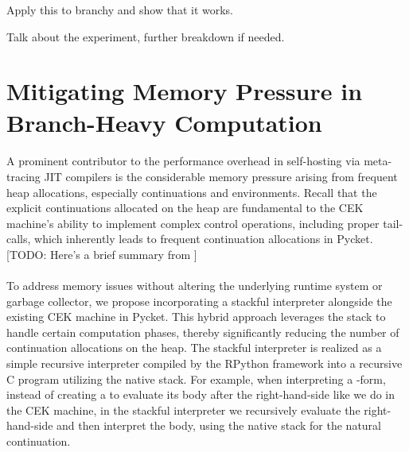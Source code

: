     \begin{show-experiment}
      Apply this to branchy and show that it works.
    \end{show-experiment}

    \begin{paragraph-here}
      Talk about the experiment, further breakdown if needed.
    \end{paragraph-here}

	\section[\texorpdfstring{Mitigating Memory Pressure in Branch-Heavy Computation}{CEK + Stackful Model}]{Mitigating Memory Pressure in Branch-Heavy Computation}
    \label{section:stackful}

    \paragraph{}%
      A prominent contributor to the performance overhead in self-hosting via meta-tracing JIT compilers is the considerable memory pressure arising from frequent heap allocations, especially continuations and environments. Recall that the explicit continuations allocated on the heap are fundamental to the CEK machine's ability to implement complex control operations, including proper tail-calls, which inherently leads to frequent continuation allocations in Pycket. [TODO: Here's a brief summary from ]

    \paragraph{}%
      To address memory issues without altering the underlying runtime system or garbage collector, we propose incorporating a stackful interpreter alongside the existing CEK machine in Pycket. This hybrid approach leverages the stack to handle certain computation phases, thereby significantly reducing the number of continuation allocations on the heap. The stackful interpreter is realized as a simple recursive interpreter compiled by the RPython framework into a recursive C program utilizing the native stack. For example, when interpreting a -form, instead of creating a  to evaluate its body after the right-hand-side like we do in the CEK machine, in the stackful interpreter we recursively evaluate the right-hand-side and then interpret the body, using the native stack for the natural continuation.

